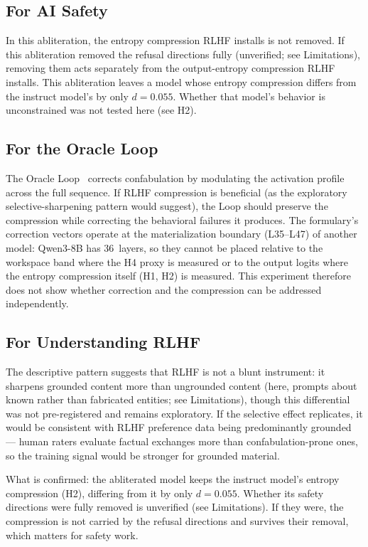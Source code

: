 \documentclass[11pt,a4paper]{article}
\begin{document}
\subsection{For AI Safety}

In this abliteration, the entropy compression RLHF installs is not
removed. If this abliteration removed the refusal directions fully
(unverified; see Limitations), removing them acts separately from the
output-entropy compression RLHF installs. This abliteration leaves a
model whose entropy compression differs from the instruct model's by
only $d{=}0.055$. Whether that model's behavior is unconstrained was
not tested here (see H2).

\subsection{For the Oracle Loop}

The Oracle Loop~\citep{lyra2026oracle} corrects confabulation by
modulating the activation profile across the full sequence. If RLHF
compression is beneficial (as the exploratory selective-sharpening pattern
would suggest), the Loop should
preserve the compression while correcting the behavioral failures
it produces. The formulary's correction vectors operate at the
materialization boundary (L35--L47) of another model: Qwen3-8B has
36~layers, so they cannot be placed relative to the workspace band
where the H4 proxy is measured or to the output logits where the
entropy compression itself (H1, H2) is measured. This
experiment therefore does not show whether correction and the
compression can be addressed independently.

\subsection{For Understanding RLHF}

The descriptive pattern suggests that RLHF is not a blunt instrument:
it sharpens grounded content more than ungrounded content (here,
prompts about known rather than fabricated entities; see Limitations),
though this differential was not pre-registered and remains exploratory.
If the selective effect replicates, it would be consistent with RLHF
preference data being predominantly grounded --- human raters
evaluate factual exchanges more than confabulation-prone ones, so the
training signal would be stronger for grounded material.

What is confirmed: the abliterated model keeps the instruct model's
entropy compression (H2), differing from it by only $d{=}0.055$.
Whether its safety directions were fully removed is unverified (see
Limitations). If they were, the compression is not carried by the
refusal directions and survives their removal, which matters for
safety work.
\end{document}
